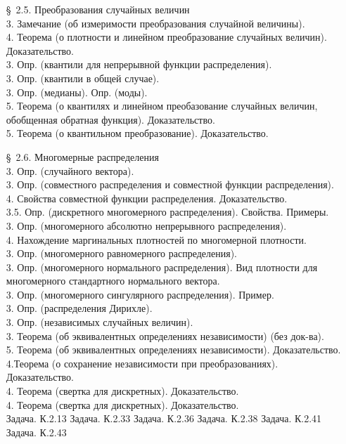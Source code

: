 \documentclass[10pt]{amsart}
\begin{document}
\begin{enumerate}
\begin{enumerate}
\item[\S\, 2.5.] Преобразования случайных величин \\
3. Замечание (об измеримости преобразования случайной величины). \\
4. Теорема (о плотности и линейном преобразование случайных величин). Доказательство. \\
3. Опр. (квантили для непрерывной функции распределения). \\
3. Опр. (квантили в общей случае). \\
3. Опр. (медианы).   Опр. (моды). \\
5. Теорема (о квантилях и линейном преобазование случайных величин, обобщенная обратная функция). Доказательство. \\
5. Теорема (о квантильном преобразование). Доказательство. \\

    
\item[\S\, 2.6.] Многомерные распределения \\
3. Опр. (случайного вектора). \\
3. Опр. (совместного распределения и  совместной функции распределения). \\
4. Свойства совместной функции распределения. Доказательство. \\
3.5. Опр. (дискретного многомерного распределения). Свойства. Примеры. \\
3. Опр. (многомерного абсолютно непрерывного распределения). \\
4. Нахождение маргинальных плотностей по многомерной плотности. \\
3. Опр. (многомерного равномерного распределения). \\
3. Опр. (многомерного нормального распределения). Вид плотности для многомерного стандартного нормального вектора. \\ 
3. Опр. (многомерного сингулярного распределения). Пример. \\
3. Опр. (распределения Дирихле). \\
3. Опр. (независимых случайных величин). \\
3. Теорема (об эквивалентных определениях независимости) (без док-ва). \\
5. Теорема (об эквивалентных определениях независимости). Доказательство. \\
4.Теорема (о сохранение независимости при преобразованиях). Доказательство. \\ 
4. Теорема (свертка для дискретных). Доказательство. \\
4. Теорема (свертка для дискретных).  Доказательство. \\
Задача. К.2.13
Задача. К.2.33
Задача. К.2.36
Задача. К.2.38
Задача. К.2.41
Задача. К.2.43
\end{enumerate}
    

\end{enumerate}
\end{document}
